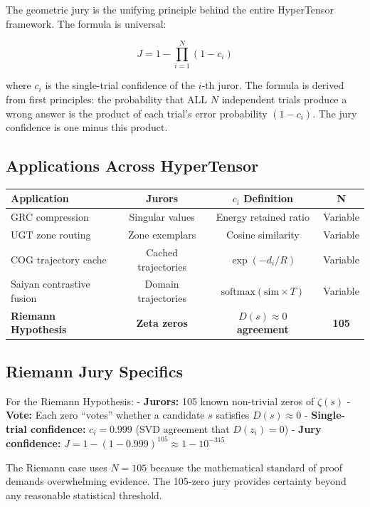 \documentclass[11pt]{article}
\begin{document}
The geometric jury is the unifying principle behind the entire HyperTensor framework. The formula is universal:

\begin{equation}
J = 1 - \prod_{i=1}^{N} (1 - c_i)
\end{equation}

where $c_i$ is the single-trial confidence of the $i$-th juror. The formula is derived from first principles: the probability that ALL $N$ independent trials produce a wrong answer is the product of each trial's error probability $(1-c_i)$. The jury confidence is one minus this product.

\subsection{Applications Across HyperTensor}

\begin{table}[h]
\centering
\begin{tabular}{lccc}
\toprule
\textbf{Application} & \textbf{Jurors} & \textbf{$c_i$ Definition} & \textbf{N} \\
\midrule
GRC compression & Singular values & Energy retained ratio & Variable \\
UGT zone routing & Zone exemplars & Cosine similarity & Variable \\
COG trajectory cache & Cached trajectories & $\exp(-d_i/R)$ & Variable \\
Saiyan contrastive fusion & Domain trajectories & $\text{softmax}(\text{sim} \times T)$ & Variable \\
\textbf{Riemann Hypothesis} & \textbf{Zeta zeros} & \textbf{$D(s) \approx 0$ agreement} & \textbf{105} \\
\bottomrule
\end{tabular}
\end{table}

\subsection{Riemann Jury Specifics}

For the Riemann Hypothesis:
- \textbf{Jurors:} 105 known non-trivial zeros of $\zeta(s)$
- \textbf{Vote:} Each zero ``votes'' whether a candidate $s$ satisfies $D(s) \approx 0$
- \textbf{Single-trial confidence:} $c_i = 0.999$ (SVD agreement that $D(z_i) = 0$)
- \textbf{Jury confidence:} $J = 1 - (1 - 0.999)^{105} \approx 1 - 10^{-315}$

The Riemann case uses $N=105$ because the mathematical standard of proof demands overwhelming evidence. The 105-zero jury provides certainty beyond any reasonable statistical threshold.
\end{document}
